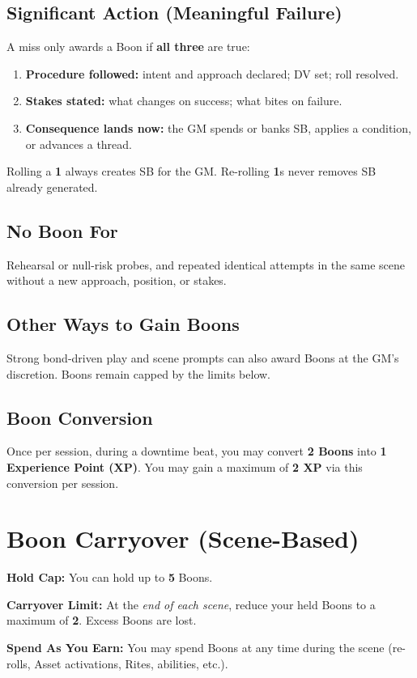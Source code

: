 \subsection*{Significant Action (Meaningful Failure)}
A miss only awards a Boon if \textbf{all three} are true:
\begin{enumerate}
  \item \textbf{Procedure followed:} intent and approach declared; DV set; roll resolved.
  \item \textbf{Stakes stated:} what changes on success; what bites on failure.
  \item \textbf{Consequence lands now:} the GM spends or banks SB, applies a condition, or advances a thread.
\end{enumerate}
\noindent Rolling a \textbf{1} always creates SB for the GM. Re-rolling \textbf{1}s never removes SB already generated.

\subsection*{No Boon For}
Rehearsal or null-risk probes, and repeated identical attempts in the same scene without a new approach, position, or stakes.

\subsection*{Other Ways to Gain Boons}
Strong bond-driven play and scene prompts can also award Boons at the GM's discretion. Boons remain capped by the limits below.

\subsection*{Boon Conversion}
Once per session, during a downtime beat, you may convert \textbf{2 Boons} into \textbf{1 Experience Point (XP)}. You may gain a maximum of \textbf{2 XP} via this conversion per session.

\section{Boon Carryover (Scene-Based)}
\textbf{Hold Cap:} You can hold up to \textbf{5} Boons.

\textbf{Carryover Limit:} At the \emph{end of each scene}, reduce your held Boons to a maximum of \textbf{2}. Excess Boons are lost.

\textbf{Spend As You Earn:} You may spend Boons at any time during the scene (re-rolls, Asset activations, Rites, abilities, etc.).

